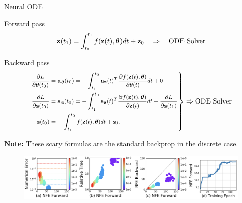 \begin{frame}{Neural ODE}
	\vspace{-0.2cm}
	\begin{block}{Forward pass}
		\vspace{-0.5cm}
		\[
			\mathbf{z}(t_1) = \int^{t_1}_{t_0} f(\mathbf{z}(t), \boldsymbol{\theta}) d t  + \mathbf{z}_0 \quad \Rightarrow \quad \text{ODE Solver}
		\]
		\vspace{-0.6cm}
	\end{block}
	\begin{block}{Backward pass}
		\vspace{-0.8cm}
		\begin{equation*}
			\left.
				{\footnotesize 
				\begin{aligned}
					\frac{\partial L}{\partial \boldsymbol{\theta}(t_0)} &= \mathbf{a}_{\boldsymbol{\theta}}(t_0) =  - \int_{t_1}^{t_0} \mathbf{a}_{\mathbf{z}}(t)^T \frac{\partial f(\mathbf{z}(t), \boldsymbol{\theta})}{\partial \boldsymbol{\theta}(t)} dt + 0 \\
					\frac{\partial L}{\partial \mathbf{z}(t_0)} &= \mathbf{a}_{\mathbf{z}}(t_0) =  - \int_{t_1}^{t_0} \mathbf{a}_{\mathbf{z}}(t)^T \frac{\partial f(\mathbf{z}(t), \boldsymbol{\theta})}{\partial \mathbf{z}(t)} dt + \frac{\partial L}{\partial \mathbf{z}(t_1)} \\
					\mathbf{z}(t_0) &= - \int^{t_0}_{t_1} f(\mathbf{z}(t), \boldsymbol{\theta}) d t  + \mathbf{z}_1.
				\end{aligned}
				}
			\right\rbrace
			 \Rightarrow
			\text{ODE Solver}
		\end{equation*}
		\vspace{-0.4cm} 
	\end{block}
	\textbf{Note:} These scary formulas are the standard backprop in the discrete case.
	\begin{figure}
		\centering
		\includegraphics[width=\linewidth]{figs/neural_ode}
	\end{figure}
\end{frame}
